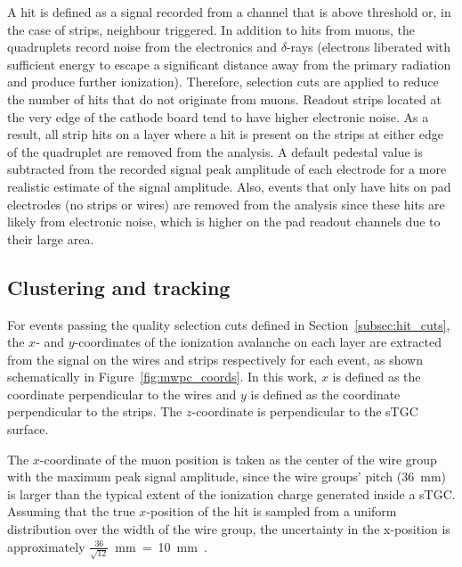 A hit is defined as a signal recorded from a channel that is above threshold or, in the case of strips, neighbour triggered. In addition to hits from muons, the quadruplets record noise from the electronics and $\delta$-rays (electrons liberated with sufficient energy to escape a significant distance away from the primary radiation and produce further ionization). Therefore, selection cuts are applied to reduce the number of hits that do not originate from muons. Readout strips located at the very edge of the cathode board tend to have higher electronic noise.  As a result, all strip hits on a layer where a hit is present on the strips at either edge of the quadruplet are removed from the analysis. A default pedestal value is subtracted from the recorded signal peak amplitude of each electrode for a more realistic estimate of the signal amplitude. Also, events that only have hits on pad electrodes (no strips or wires) are removed from the analysis since these hits are likely from electronic noise, which is higher on the pad readout channels due to their large area.

\subsection{Clustering and tracking}
\label{subsec:clustering}
For events passing the quality selection cuts defined in Section~\ref{subsec:hit_cuts}, the $x$- and $y$-coordinates of the ionization avalanche on each layer are extracted from the signal on the wires and strips respectively for each event, as shown schematically in Figure~\ref{fig:mwpc_coords}. In this work, $x$ is defined as the coordinate perpendicular to the wires and $y$ is defined as the coordinate perpendicular to the strips. The $z$-coordinate is perpendicular to the sTGC surface.

The $x$-coordinate of the muon position is taken as the center of the wire group with the maximum peak signal amplitude, since the wire groups' pitch (\SI{36}{\milli\meter}) is larger than the typical extent of the ionization charge generated inside a sTGC. Assuming that the true $x$-position of the hit is sampled from a uniform distribution over the width of the wire group, the uncertainty in the x-position is approximately $\frac{36}{\sqrt{12}}$~mm~=~10~mm~\cite{Sauli:117989}.

